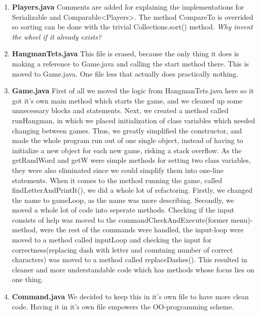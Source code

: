 \documentclass{article}
\begin{document}
\begin{enumerate}
	\item
	\textbf{Players.java}
	Comments are added for explaining the implementations for Serializable and Comparable<Players>.
	The method CompareTo is overrided so sorting can be done with the trivial Collections.sort() method. \textit{Why invent the wheel if it already exists?} 
	\item
	\textbf{HangmanTets.java}
	This file is erased, because the only thing it does is making a reference to Game.java and calling the start method there. This is moved to Game.java. One file less that actually does practically nothing.
	\item
	\textbf{Game.java}
	First of all we moved the logic from HangmanTets.java here so it got it's own main method which starts the game, and we cleaned up some unnecessary blocks and statements. Next, we
	created a method called runHangman, in which we placed initialization of class variables
	which needed changing between games. Thus, we greatly simplified the constructor, and
	made the whole program run out of one single object, instead of having to initialize a
	new object for each new game, risking a stack overflow. As the getRandWord and getW were 
	simple methods for setting two class variables, they were also eliminated since we could
	simplify them into one-line statements. When it comes to the method running the game, 
	called findLetterAndPrintIt(),
	we did a whole lot of refactoring. Firstly, we changed the name to gameLoop, as the name
	was more describing. Secondly, we moved a whole lot of code into seperate methods. Checking
	if the input consists of help was moved to the commandCheckAndExecute(former menu)-method, 
	were the rest of the commands were handled, the input-loop were moved to a method called
	inputLoop and checking the input for correctness(replacing dash with letter and countning 
	number of correct characters) was moved to a method called 
	replaceDashes(). This resulted in cleaner and more understandable code which has methods
	whose focus lies on one thing.

	\item
	\textbf{Command.java}
	We decided to keep this in it's own file to have more clean code. Having it in it's own file empowers the OO-programming scheme.

\end{enumerate}
\end{document}

